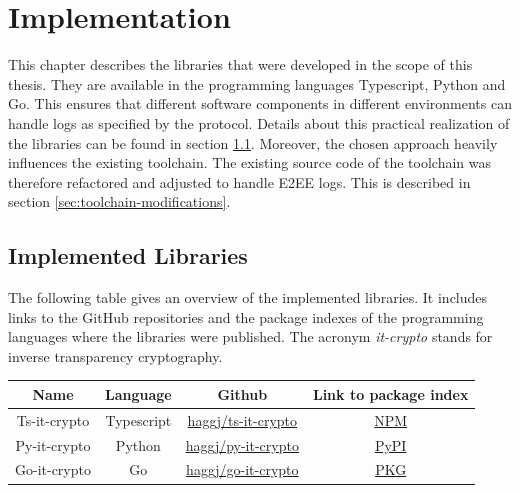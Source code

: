\documentclass[../main.tex]{subfiles}
\begin{document}
\chapter{Implementation}
\label{chap:implementation}

This chapter describes the libraries that were developed in the scope of this thesis.
They are available in the programming languages Typescript, Python and Go.
This ensures that different software components in different environments can handle logs as specified by the protocol.
Details about this practical realization of the libraries can be found in section \ref{sec:implemented-libraries}.
Moreover, the chosen approach heavily influences the existing toolchain.
The existing source code of the toolchain was therefore refactored and adjusted to handle E2EE logs.
This is described in section \ref{sec:toolchain-modifications}.

\section{Implemented Libraries}
\label{sec:implemented-libraries}

The following table gives an overview of the implemented libraries.
It includes links to the GitHub repositories and the package indexes of the programming languages where the libraries were published.
The acronym \emph{it-crypto} stands for inverse transparency cryptography.

\begin{table}[ht]
    \centering
    \begin{tabular}{|c|c|c|c|}
    \hline
    Name         & Language & Github                           & Link to package index                                   \\ \hline
    Ts-it-crypto & Typescript           & \href{https://github.com/haggj/ts-it-crypto}{haggj/ts-it-crypto} & \href{https://www.npmjs.com/package/ts-it-crypto}{NPM}       \\ \hline
    Py-it-crypto & Python               & \href{https://github.com/haggj/py-it-crypto}{haggj/py-it-crypto} & \href{https://pypi.org/project/py-it-crypto/}{PyPI}          \\ \hline
    Go-it-crypto & Go                   & \href{https://github.com/haggj/go-it-crypto}{haggj/go-it-crypto} & \href{https://pkg.go.dev/github.com/haggj/go-it-crypto}{PKG} \\ \hline
    \end{tabular}
\end{table}
\end{document}
